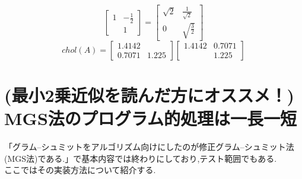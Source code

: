 \begin{framed}
\[\begin{bmatrix}1 & -\frac{1}{2} \\ & 1\end{bmatrix}
=
\begin{bmatrix}\sqrt{2} & \frac{1}{\sqrt{2}} \\ 0 & \sqrt{\frac{3}{2}}\end{bmatrix}
\]
\[
chol(A)=
\begin{bmatrix}1.4142 &  \\ 0.7071 & 1.225\end{bmatrix}
\begin{bmatrix}1.4142 & 0.7071 \\ & 1.225\end{bmatrix}
\]
\end{framed}
\section{(最小2乗近似を読んだ方にオススメ！)\\MGS法のプログラム的処理は一長一短}
「グラム--シュミットをアルゴリズム向けにしたのが修正グラム--シュミット法(MGS法)である.」で基本内容では終わりにしており,テスト範囲でもある.\\
ここではその実装方法について紹介する.
